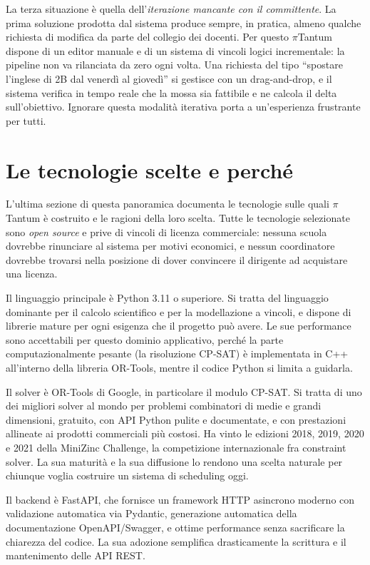 La terza situazione \`e quella dell'\emph{iterazione
mancante con il committente}. La prima soluzione prodotta
dal sistema produce sempre, in pratica, almeno qualche
richiesta di modifica da parte del collegio dei docenti. Per
questo $\pi$Tantum dispone di un editor manuale e di un
sistema di vincoli logici incrementale: la pipeline non va
rilanciata da zero ogni volta. Una richiesta del tipo
``spostare l'inglese di 2B dal venerd\`i al gioved\`i'' si
gestisce con un drag-and-drop, e il sistema verifica in
tempo reale che la mossa sia fattibile e ne calcola il delta
sull'obiettivo. Ignorare questa modalit\`a iterativa porta a
un'esperienza frustrante per tutti.

\section{Le tecnologie scelte e perch\'e}

L'ultima sezione di questa panoramica documenta le tecnologie
sulle quali $\pi$Tantum \`e costruito e le ragioni della loro
scelta. Tutte le tecnologie selezionate sono \emph{open
source} e prive di vincoli di licenza commerciale: nessuna
scuola dovrebbe rinunciare al sistema per motivi economici, e
nessun coordinatore dovrebbe trovarsi nella posizione di
dover convincere il dirigente ad acquistare una licenza.

Il linguaggio principale \`e Python 3.11 o superiore. Si tratta
del linguaggio dominante per il calcolo scientifico e per la
modellazione a vincoli, e dispone di librerie mature per
ogni esigenza che il progetto pu\`o avere. Le sue performance
sono accettabili per questo dominio applicativo, perch\'e la
parte computazionalmente pesante (la risoluzione CP-SAT) \`e
implementata in C++ all'interno della libreria OR-Tools,
mentre il codice Python si limita a guidarla.

Il solver \`e OR-Tools di Google, in particolare il modulo
CP-SAT. Si tratta di uno dei migliori solver al mondo per
problemi combinatori di medie e grandi dimensioni, gratuito,
con API Python pulite e documentate, e con prestazioni
allineate ai prodotti commerciali pi\`u costosi. Ha vinto le
edizioni 2018, 2019, 2020 e 2021 della MiniZinc Challenge, la
competizione internazionale fra constraint solver. La sua
maturit\`a e la sua diffusione lo rendono una scelta
naturale per chiunque voglia costruire un sistema di
scheduling oggi.

Il backend \`e FastAPI, che fornisce un framework HTTP
asincrono moderno con validazione automatica via Pydantic,
generazione automatica della documentazione OpenAPI/Swagger,
e ottime performance senza sacrificare la chiarezza del
codice. La sua adozione semplifica drasticamente la scrittura
e il mantenimento delle API REST.

